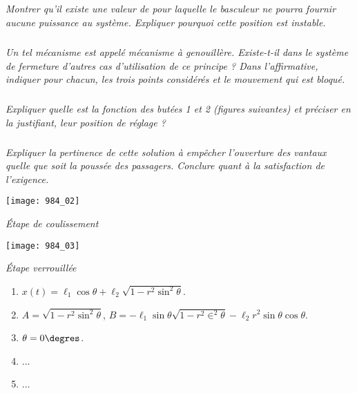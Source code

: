\subparagraph{}
\textit{Montrer qu’il existe une valeur de pour laquelle le basculeur ne pourra fournir aucune puissance au système. Expliquer pourquoi cette position est instable.}
\ifprof
\begin{corrige}
\end{corrige}
\else
\fi

\subparagraph{}
\textit{Un tel mécanisme est appelé mécanisme à genouillère. Existe-t-il dans le
système de fermeture d’autres cas d’utilisation de ce principe ? Dans l’affirmative,
indiquer pour chacun, les trois points considérés et le mouvement qui est
bloqué.}
\ifprof
\begin{corrige}
\end{corrige}
\else
\fi

\subparagraph{}
\textit{Expliquer quelle est la fonction des butées 1 et 2 (figures suivantes) et préciser
en la justifiant, leur position de réglage ?}
\ifprof
\begin{corrige}
\end{corrige}
\else
\fi

\subparagraph{}
\textit{Expliquer la pertinence de cette solution à empêcher l’ouverture des vantaux
quelle que soit la poussée des passagers. Conclure quant à la satisfaction de l'exigence.}
\ifprof
\begin{corrige}
\end{corrige}
\else
\fi


\begin{center}
\texttt{[image: 984\_02]}%

 \textit{Étape de coulissement}
\end{center}

\begin{center}
\texttt{[image: 984\_03]}%

 \textit{Étape verrouillée}
\end{center}


\begin{enumerate}
\item $x(t)=\ell_1 \cos\theta +\ell_2 \sqrt{1-r^2\sin^2\theta}$.
\item $A=\sqrt{1-r^2\sin^2\theta}$, $B=-\ell_1\sin\theta\sqrt{1-r^2\in^2\theta}-\ell_2r^2\sin\theta\cos\theta$.
\item $\theta=0\degres$.
\item ...
\item ...
\end{enumerate}
